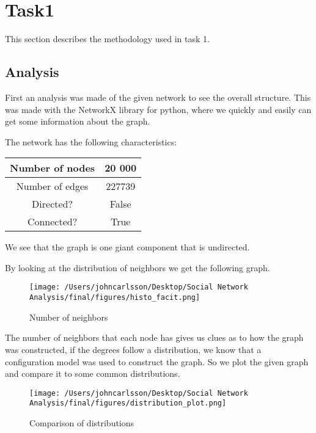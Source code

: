 \documentclass[conference]{IEEEtran}
\begin{document}
\section{Task1}
This section describes the methodology used in task 1.

\subsection{Analysis}
First an analysis was made of the given network to see the overall structure. This was made with the NetworkX
library for python, where we quickly and easily can get some information about the graph.


The network has the following characteristics:
\begin{center}
    \begin{tabular}{|c|c|}
        
        \hline
        Number of nodes & 20 000 \\
        \hline
        Number of edges & 227739 \\
        \hline
        Directed? & False \\
        \hline
        Connected? & True \\
        \hline
    \end{tabular}

\end{center}

We see that the graph is one giant component that is undirected.


By looking at the distribution of neighbors we get the following graph.
\begin{figure}[h]
    \centering
    \caption{Number of neighbors}
\texttt{[image: /Users/johncarlsson/Desktop/Social Network Analysis/final/figures/histo\_facit.png]}
\end{figure}

The number of neighbors that each node has gives us clues as to how the graph was constructed, if the degrees follow
a distribution, we know that a configuration model was used to construct the graph. So we plot the given graph and compare it
to some common distributions.

\begin{figure}[h]
    \centering
    \caption{Comparison of distributions}
\texttt{[image: /Users/johncarlsson/Desktop/Social Network Analysis/final/figures/distribution\_plot.png]}
\end{figure}
\end{document}
